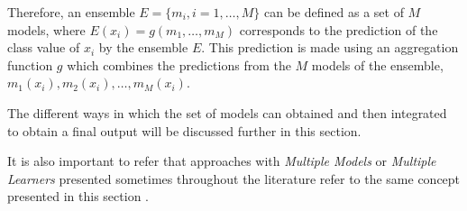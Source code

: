 Therefore, an ensemble $E = \{m_i, i = 1, \dots, M \}$ can be defined as a set of $M$ models, where $E(x_i) = g(m_1, \dots, m_M)$ corresponds to the prediction of the class value of $x_i$ by the ensemble $E$. This prediction is made using an aggregation function $g$ which combines the predictions from the $M$ models of the ensemble, $m_1(x_i), m_2(x_i), \ldots, m_M(x_i)$.



The different ways in which the set of models can obtained and then integrated to obtain a final output will be discussed further in this section. 



It is also important to refer that approaches with \textit{Multiple Models} or \textit{Multiple Learners} presented sometimes throughout the literature refer to the same concept presented in this section \cite{Mendes-Moreira2012}.

